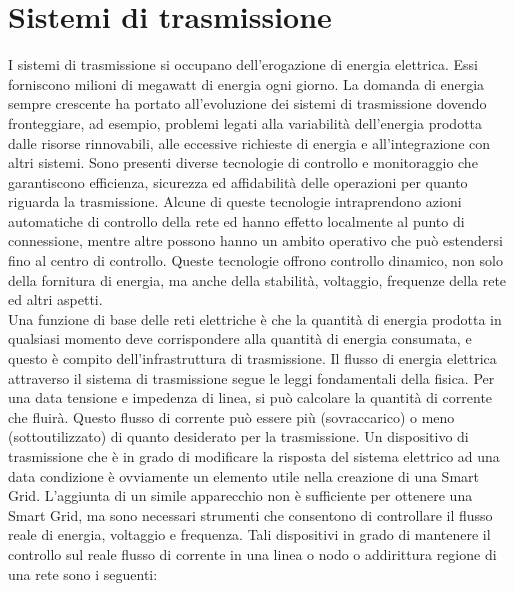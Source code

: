 \section{Sistemi di trasmissione}
I sistemi di trasmissione si occupano dell'erogazione di energia elettrica. Essi forniscono milioni di megawatt di energia ogni giorno. La domanda di energia sempre crescente ha portato all'evoluzione dei sistemi di trasmissione  dovendo fronteggiare, ad esempio, problemi legati alla variabilità dell'energia prodotta dalle risorse rinnovabili, alle eccessive richieste di energia e all'integrazione con altri sistemi. Sono presenti diverse tecnologie di controllo e monitoraggio che garantiscono efficienza, sicurezza ed affidabilità delle operazioni per quanto riguarda la trasmissione. Alcune di queste tecnologie intraprendono azioni automatiche di controllo della rete ed hanno effetto localmente al punto di connessione, mentre altre possono hanno un ambito operativo che può estendersi fino al centro di controllo. Queste tecnologie offrono controllo dinamico, non solo della fornitura di energia, ma anche della stabilità, voltaggio, frequenze della rete ed altri aspetti.
\\
Una funzione di base delle reti elettriche è che la quantità di energia prodotta in qualsiasi momento deve corrispondere alla quantità di energia consumata, e questo è compito dell'infrastruttura di trasmissione. Il flusso di energia elettrica attraverso il sistema di trasmissione segue le leggi fondamentali della fisica. Per una data tensione e impedenza di linea, si può calcolare la quantità di corrente che fluirà. Questo flusso di corrente può essere più (sovraccarico) o meno (sottoutilizzato) di quanto desiderato per la trasmissione. Un dispositivo di trasmissione che è in grado di modificare  la risposta del sistema elettrico ad una data condizione è ovviamente un elemento utile nella creazione di una Smart Grid. L'aggiunta di un simile apparecchio non è sufficiente per ottenere una Smart Grid, ma sono necessari strumenti che consentono di controllare il flusso reale di energia, voltaggio e frequenza. Tali dispositivi in ​​grado di mantenere il controllo sul reale flusso di corrente in una linea o nodo o addirittura regione di una rete sono i seguenti:
